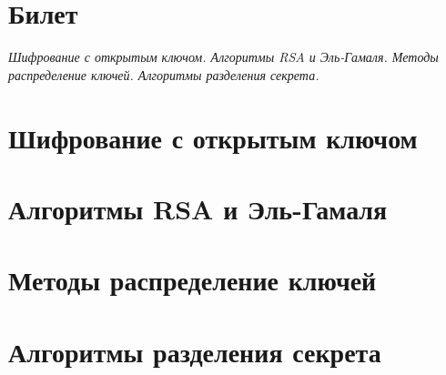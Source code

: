 \documentclass[a4paper,12pt]{article}
\begin{document}
\section*{Билет }
{\em Шифрование с открытым ключом. Алгоритмы RSA и Эль-Гамаля.
Методы распределение ключей. Алгоритмы разделения секрета.}

\section{Шифрование с открытым ключом} 
\section{Алгоритмы RSA и Эль-Гамаля}
\section{Методы распределение ключей} 
\section{Алгоритмы разделения секрета}
\end{document}
